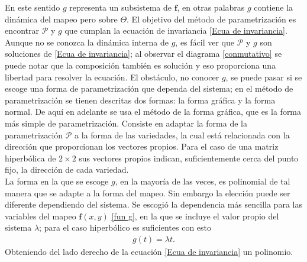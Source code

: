 En este sentido $g$ representa un subsistema de $\mathbf{f}$, en otras palabras $g$ contiene la dinámica del mapeo pero sobre $\Theta$. El objetivo del método de parametrización es encontrar $\mathcal{P}$ y $g$ que cumplan la ecuación de invariancia \eqref{Ecua de invariancia}. Aunque no se conozca la dinámica interna de $g$, es fácil ver que $\mathcal{P}$ y $g$ son soluciones de \eqref{Ecua de invariancia}; al observar el diagrama \eqref{conmutativo} se puede notar que la composición también es solución y eso proporciona una libertad para resolver la ecuación. El obstáculo, no conocer $g$, se puede pasar si se escoge una forma de parametrización que dependa del sistema; en el método de parametrización se tienen descritas dos formas: la forma gráfica y la forma normal. De aquí en adelante se usa el método de la forma gráfica, que es la forma más simple de parametrización. Consiste en adaptar la forma de la parametrización $\mathcal{P}$ a la forma de las variedades, la cual está relacionada con la dirección que proporcionan los vectores propios. Para el caso de una matriz hiperbólica de $2\times 2$ sus vectores propios indican, suficientemente cerca del punto fijo, la dirección de cada variedad. \\


La forma en la que se escoge $g$, en la mayoría de las veces, es polinomial de tal manera que se adapte a la forma del mapeo. Sin embargo la elección puede ser diferente dependiendo del sistema. Se escogió la dependencia más sencilla para las variables del mapeo $\mathbf{f}(x,y)$ \eqref{fun g}, en la que se incluye el valor propio del sistema $\lambda$; para el caso hiperbólico es suficientes con esto
\begin{eqnarray}
g(t) = \lambda t.
\label{fun g}
\end{eqnarray}
Obteniendo del lado derecho de la ecuación \eqref{Ecua de invariancia} un polinomio. \\


